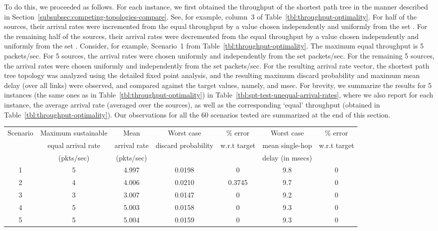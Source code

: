 \documentclass[12pt, draftclsnofoot, onecolumn]{IEEEtran}
\begin{document}
To do this, we proceeded as follows. For each instance, we first obtained the throughput of the shortest path tree in the manner described in Section~\ref{subsubsec:competing-topologies-compare}. See, for example, column~3 of Table~\ref{tbl:throughput-optimality}. For half of the sources, their arrival rates were incremented from the equal throughput by a value chosen independently and uniformly from the set . For the remaining half of the sources, their arrival rates were decremented from the equal throughput by a value chosen independently and uniformly from the set . Consider, for example, Scenario~1 from Table~\ref{tbl:throughput-optimality}. The maximum equal throughput is 5 packets/sec. For 5 sources, the arrival rates were chosen uniformly and independently from the set  packets/sec. For the remaining 5 sources, the arrival rates were chosen uniformly and independently from the set  packets/sec. For the resulting arrival rate vector, the shortest path tree topology was analyzed using the detailed fixed point analysis, and the resulting maximum discard probability and maximum mean delay (over all links) were observed, and compared against the target values, namely,  and  msec. For brevity, we summarize the results for 5 instances (the same ones as in Table~\ref{tbl:throughput-optimality}) in Table~\ref{tbl:spt-test-unequal-arrival-rates}, where we also report for each instance, the average arrival rate (averaged over the sources), as well as the corresponding `equal' throughput (obtained in Table~\ref{tbl:throughput-optimality}). Our observations for all the 60 scenarios tested are summarized at the end of this section.

\begin{table*}[ht]
  \centering
\caption{Worst case (over all links) values of discard probability and single-hop mean delay for the shortest path tree under slight deviations in arrival rates from the maximum sustainable equal arrival rate}
\label{tbl:spt-test-unequal-arrival-rates}
\scriptsize
  \begin{tabular}{|c|c|c|c|c|c|c|}\hline
    Scenario & Maximum sustainable & Mean & Worst case & \% error & Worst case & \% error\\
          & equal arrival rate       & arrival rate & discard probability & w.r.t target & mean single-hop & w.r.t target\\
         &   (pkts/sec)                 &  (pkts/sec)  &                               &                    &   delay (in msecs) &                  \\
 \hline
    1 & 5 & 4.997 & 0.0198 & 0 & 9.8 & 0\\
 \hline
    2 & 4 & 4.006 & 0.0210 & 0.3745 & 9.7 & 0\\
 \hline
    3 & 3 & 3.007 & 0.0147 & 0 & 9.2 & 0 \\
 \hline
    4 & 5 & 5.003 & 0.0158 & 0 & 9.3 & 0\\
 \hline
    5 & 5 & 5.004 & 0.0159 & 0 & 9.3 & 0\\
\hline
\end{tabular}
\normalsize
\end{table*} 
\end{document}
